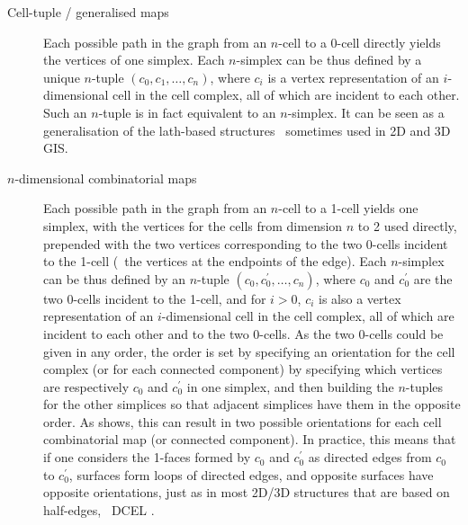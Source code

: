 \begin{description}
\item[Cell-tuple / generalised maps]
Each possible path in the graph from an $n$-cell to a 0-cell directly yields the vertices of one simplex.
Each $n$-simplex can be thus defined by a unique $n$-tuple $(c_{0}, c_{1}, \ldots, c_{n})$, where $c_{i}$ is a vertex representation of an $i$-dimensional cell in the cell complex, all of which are incident to each other.
Such an $n$-tuple is in fact equivalent to an $n$-simplex.
It can be seen as a generalisation of the lath-based structures~\citep{Joy03} sometimes used in 2D and 3D GIS.\@

\item[$n$-dimensional combinatorial maps]
Each possible path in the graph from an $n$-cell to a 1-cell yields one simplex, with the vertices for the cells from dimension $n$ to 2 used directly, prepended with the two vertices corresponding to the two 0-cells incident to the 1-cell (\ie\ the vertices at the endpoints of the edge).
Each $n$-simplex can be thus defined by an $n$-tuple $(c_{0}, c_{0}^\prime, \ldots, c_{n})$, where $c_{0}$ and $c_{0}^\prime$ are the two 0-cells incident to the 1-cell, and for $i > 0$, $c_{i}$ is also a vertex representation of an $i$-dimensional cell in the cell complex, all of which are incident to each other and to the two 0-cells.
As the two 0-cells could be given in any order, the order is set by specifying an orientation for the cell complex (or for each connected component) by specifying which vertices are respectively $c_{0}$ and $c_{0}^\prime$ in one simplex, and then building the $n$-tuples for the other simplices so that adjacent simplices have them in the opposite order.
As  shows, this can result in two possible orientations for each cell combinatorial map (or connected component).
In practice, this means that if one considers the 1-faces formed by $c_{0}$ and $c_{0}^\prime$ as directed edges from $c_{0}$ to $c_{0}^\prime$, surfaces form loops of directed edges, and opposite surfaces have opposite orientations, just as in most 2D/3D structures that are based on half-edges, \eg\ DCEL \citep{Muller78}.
\end{description}
